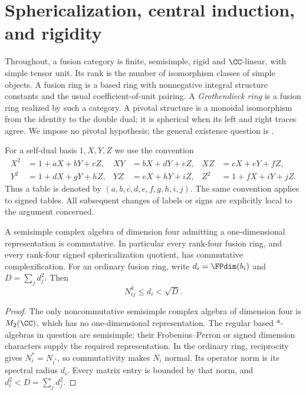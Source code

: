 \section{Sphericalization, central induction, and rigidity}\label{sec:core}
Throughout, a fusion category is finite, semisimple, rigid and
$\CC$-linear, with simple tensor unit. Its rank is the number
of isomorphism classes of simple objects. A fusion ring is a based
ring with nonnegative integral structure constants and the usual
coefficient-of-unit pairing. A \emph{Grothendieck ring} is a fusion
ring realized by such a category. A pivotal structure is a monoidal isomorphism from the identity to
the double dual; it is spherical when its left and right traces agree.
We impose no pivotal hypothesis; the general existence question is
\cite[Conjecture~2.8]{ENO}.

For a self-dual basis $1,X,Y,Z$ we use the convention
\begin{equation}\label{eq:tuple-convention}
\begin{aligned}
X^2&=1+aX+bY+cZ,&XY&=bX+dY+eZ,&XZ&=cX+eY+fZ,\\
Y^2&=1+dX+gY+hZ,&YZ&=eX+hY+iZ,&Z^2&=1+fX+iY+jZ.
\end{aligned}
\end{equation}
Thus a table is denoted by $(a,b,c,d,e,f,g,h,i,j)$.
The same convention applies to signed tables. All subsequent changes
of labels or signs are explicitly local to the argument concerned.

\begin{lemma}
\label{core:lem:rank-four-algebra}\label{core:lem:coefficient-bound}
A semisimple complex algebra of dimension four admitting a
one-dimensional representation is commutative. In particular every
rank-four fusion ring, and every rank-four signed sphericalization
quotient, has commutative complexification. For an ordinary fusion ring,
write $d_i=\FPdim(b_i)$ and $D=\sum_jd_j^2$. Then
\[
 N_{ij}^{k}\le d_i<\sqrt D.
\]
\end{lemma}
\begin{proof}
The only noncommutative semisimple complex algebra of dimension four
is $M_2(\CC)$, which has no one-dimensional representation.
The regular based $*$-algebras in question are semisimple; their
Frobenius--Perron or signed dimension characters supply the required
representation. In the ordinary ring, reciprocity gives
$N_i^*=N_{i^*}$, so commutativity makes $N_i$ normal. Its operator norm
is its spectral radius $d_i$. Every matrix entry is bounded by that
norm, and $d_i^2<D=\sum_jd_j^2$.
\end{proof}

